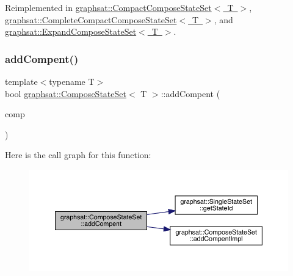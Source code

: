 Reimplemented in \mbox{\hyperlink{classgraphsat_1_1_compact_compose_state_set_ad728351fbf1e81740088147289ef3884}{graphsat\+::\+Compact\+Compose\+State\+Set$<$ T $>$}}, \mbox{\hyperlink{classgraphsat_1_1_complete_compact_compose_state_set_aaf32e840a543a728f1b849e6c8aecab8}{graphsat\+::\+Complete\+Compact\+Compose\+State\+Set$<$ T $>$}}, and \mbox{\hyperlink{classgraphsat_1_1_expand_compose_state_set_ad56d86ce711a4586fcdaacc7e94d4e18}{graphsat\+::\+Expand\+Compose\+State\+Set$<$ T $>$}}.

\mbox{\label{classgraphsat_1_1_compose_state_set_a205740accb316d74a4af24e2a91b3a6d}} 
\subsubsection{\texorpdfstring{addCompent()}{addCompent()}}
{\footnotesize\ttfamily template$<$typename T$>$ \\
bool \mbox{\hyperlink{classgraphsat_1_1_compose_state_set}{graphsat\+::\+Compose\+State\+Set}}$<$ T $>$\+::add\+Compent (\begin{DoxyParamCaption}\item[{\mbox{\hyperlink{classgraphsat_1_1_single_state_set}{Single\+State\+Set}}$<$ T $>$ \&}]{comp }\end{DoxyParamCaption})\hspace{0.3cm}{\ttfamily [inline]}}

Here is the call graph for this function\+:\nopagebreak
\begin{figure}[H]
\begin{center}
\leavevmode
\includegraphics[width=350pt]{classgraphsat_1_1_compose_state_set_a205740accb316d74a4af24e2a91b3a6d_cgraph}
\end{center}
\end{figure}
\mbox{\label{classgraphsat_1_1_compose_state_set_a143dc652308b16919867155d59fa0a09}} 
